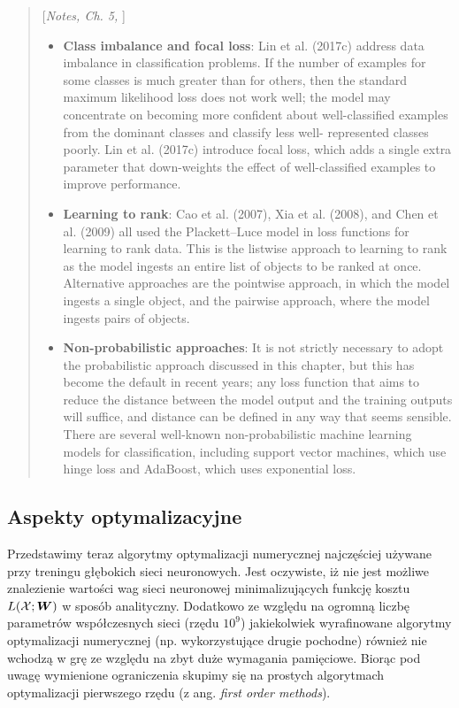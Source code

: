 \documentclass{myclass}
\numberwithin{equation}{subsection}
\begin{document}
\begin{quote}[\textit{Notes, Ch. 5,} \cite{prince2023understanding}]
\begin{itemize}
\item \textbf{Class imbalance and focal loss}: Lin et al. (2017c) address data imbalance in
classification problems. If the number of examples for some classes is much greater than for others,
then the standard maximum likelihood loss does not work well; the model may concentrate on becoming
more confident about well-classified examples from the dominant classes and classify less well-
represented classes poorly. Lin et al. (2017c) introduce focal loss, which adds a single extra
parameter that down-weights the effect of well-classified examples to improve performance.

\item \textbf{Learning to rank}: Cao et al. (2007), Xia et al. (2008), and Chen et al. (2009) all
used the Plackett--Luce model in loss functions for learning to rank data. This is the listwise
approach to learning to rank as the model ingests an entire list of objects to be ranked at once.
Alternative approaches are the pointwise approach, in which the model ingests a single object, and
the pairwise approach, where the model ingests pairs of objects.

\item \textbf{Non-probabilistic approaches}: It is not strictly necessary to adopt the probabilistic
approach discussed in this chapter, but this has become the default in recent years; any loss
function that aims to reduce the distance between the model output and the training outputs will
suffice, and distance can be defined in any way that seems sensible. There are several well-known
non-probabilistic machine learning models for classification, including support vector machines,
which use hinge loss and AdaBoost, which uses exponential loss.
\end{itemize}
\end{quote}


\subsection{Aspekty optymalizacyjne}

Przedstawimy teraz algorytmy optymalizacji numerycznej najczęściej używane przy treningu głębokich
sieci neuronowych. Jest oczywiste, iż nie jest możliwe znalezienie wartości wag sieci neuronowej
minimalizujących funkcję kosztu \(L(\mathcal{X}; \bm{W})\) w sposób analityczny. Dodatkowo ze względu na
ogromną liczbę parametrów współczesnych sieci (rzędu \(10^9\)) jakiekolwiek wyrafinowane algorytmy
optymalizacji numerycznej (np. wykorzystujące drugie pochodne) również nie wchodzą w grę ze względu
na zbyt duże wymagania pamięciowe. Biorąc pod uwagę wymienione ograniczenia skupimy się na prostych
algorytmach optymalizacji pierwszego rzędu (z ang. \textit{first order methods}).
\end{document}
